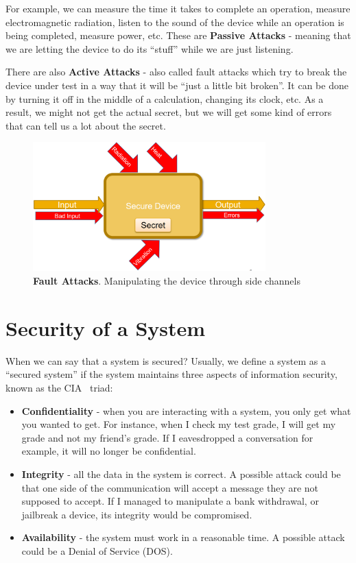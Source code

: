 For example, we can measure the time it takes to complete an operation,
measure electromagnetic radiation, listen to the sound of the device while an operation is being completed, measure power, etc. These are \textbf{Passive Attacks} - meaning that we are letting the device to do its ``stuff'' while we are just listening.

There are also \textbf{Active Attacks} - also called fault attacks which try to
break the device under test in a way that it will be ``just a little bit broken''.
It can be done by turning it off in the middle of a calculation, changing its clock, etc. 
As a result, we might not get the actual secret, but we will get some kind of errors that can tell us a lot about the secret. 

\begin{figure}[!ht]
    \centering
    \includegraphics[width=0.8\textwidth]{images/ch1_Intro/Secure_device3.png}
    \caption{\textbf{Fault Attacks}. Manipulating the device through side channels}
    \label{fig:SecDev3}
\end{figure}

\section{Security of a System} \label{sec:SystemSecurity}

When we can say that a system is secured? Usually, we define a system as a
``secured system'' if the system maintains three aspects of information security,
known as the CIA~\cite{cia} triad:

\begin{itemize}
    \item \textbf{Confidentiality} - when you are interacting with a system, you
    only get what you wanted to get. For instance, when I check my test grade,
    I will get my grade and not my friend's grade. If I eavesdropped a conversation for example, it will no longer be confidential.
    \item \textbf{Integrity} - all the data in the system is correct. A possible
    attack could be that one side of the communication will accept a message
    they are not supposed to accept. If I managed to manipulate a bank withdrawal, or jailbreak a device, its integrity would be compromised.
    \item \textbf{Availability} - the system must work in a reasonable time. A
    possible attack could be a Denial of Service (DOS).
\end{itemize}

